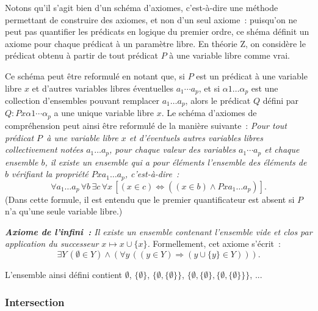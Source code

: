 \done

\medskip

Notons qu'il s'agit bien d'un schéma d'axiomes, c'est-à-dire une méthode permettant de construire des axiomes, et non d'un seul axiome : puisqu'on ne peut pas quantifier les prédicats en logique du premier ordre, ce shéma définit un axiome pour chaque prédicat à un paramètre libre. 
En théorie Z, on considère le prédicat obtenu à partir de tout prédicat $P$ à une variable libre comme vrai.

Ce schéma peut être reformulé en notant que, si $P$ est un prédicat à une variable libre $x$ et d'autres variables libres éventuelles $a_1 \cdots a_p$, et si $\alpha 1 \dots \alpha_p$ est une collection d'ensembles pouvant remplacer $a_1 \dots a_p$, alors le prédicat $Q$ défini par $Q: P x \alpha1 \cdots \alpha_p$ a une unique variable libre $x$. 
Le schéma d'axiomes de compréhension peut ainsi être reformulé de la manière suivante : 
\textit{Pour tout prédicat $P$ à une variable libre $x$ et d'éventuels autres variables libres collectivement notées $a_1 \dots a_p$, pour chaque valeur des variables $a_1 \cdots a_p$ et chaque ensemble $b$, il existe un ensemble qui a pour éléments l'ensemble des éléments de $b$ vérifiant la propriété $P x a_1 \dots a_p$, c'est-à-dire :}
\begin{equation*}
\forall a_1 \dots a_p \, \forall b \, \exists c \, \forall x \, [ (x \in c) \Leftrightarrow ((x \in b) \wedge P x a_1 \dots a_p)]. 
\end{equation*}
(Dans cette formule, il est entendu que le premier quantificateur est absent si $P$ n'a qu'une seule variable libre.) 

\medskip

\noindent\textit{\textbf{Axiome de l'infini :} Il existe un ensemble contenant l'ensemble vide et clos par application du successeur $x \mapsto x \cup \lbrace x \rbrace$.} Formellement, cet axiome s'écrit : 
\begin{equation*}
    \exists Y \, (\emptyset \in Y) \wedge (\forall y \, ((y \in Y) \Rightarrow (y \cup \lbrace y \rbrace \in Y))). 
\end{equation*}

\medskip

L'ensemble ainsi défini contient $\emptyset$, $\lbrace \emptyset \rbrace$, $\lbrace \emptyset, \lbrace \emptyset \rbrace \rbrace$, $\lbrace \emptyset, \lbrace \emptyset \rbrace, \lbrace \emptyset, \lbrace \emptyset \rbrace \rbrace \rbrace$, ...

\subsubsection{Intersection} 


